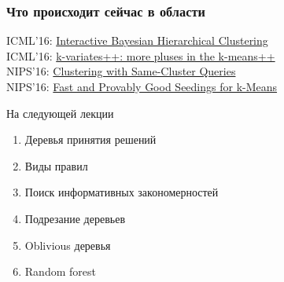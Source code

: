 \documentclass[10pt]{beamer}
\begin{document}
\begin{frame}\frametitle{Что происходит сейчас в области}
  ICML'16: \href{https://arxiv.org/pdf/1602.03258.pdf}{Interactive Bayesian Hierarchical Clustering}\\
  \bigbreak
  ICML'16: \href{https://arxiv.org/pdf/1602.01198.pdf}{k-variates++: more pluses in the k-means++}\\
  \bigbreak
  NIPS'16: \href{https://arxiv.org/pdf/1606.02404}{Clustering with Same-Cluster Queries}\\
  \bigbreak
  NIPS'16: \href{https://las.inf.ethz.ch/files/bachem16fast.pdf}{Fast and Provably Good Seedings for k-Means}\\
\end{frame}

\begin{frame}{На следующей лекции}
  	\begin{enumerate} [--]
		\item Деревья принятия решений
		\item Виды правил
		\item Поиск информативных закономерностей		
		\item Подрезание деревьев	
		\item Oblivious деревья
		\item Random forest
	\end{enumerate}
\end{frame}
\end{document}
